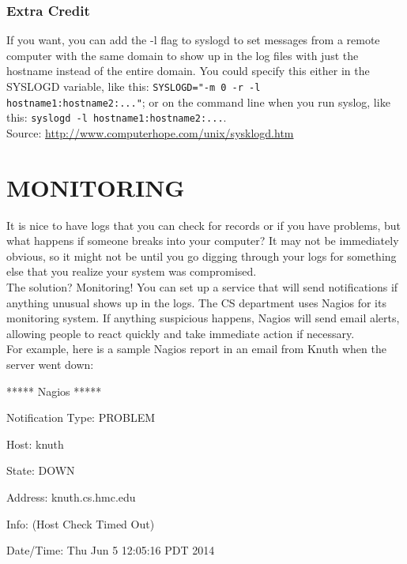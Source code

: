 \documentclass{article}
\begin{document}
\subsubsection*{Extra Credit}

\indent\indent If you want, you can add the -l flag to syslogd to set messages from a remote computer with the same domain to show up in the log files with just the hostname instead of the entire domain. You could specify this either in  the SYSLOGD variable, like this: \verb|SYSLOGD="-m 0 -r -l hostname1:hostname2:..."|; or on the command line when you run syslog, like this: \verb|syslogd -l hostname1:hostname2:...|. \\

Source:  \url{http://www.computerhope.com/unix/sysklogd.htm}

\section*{MONITORING}

\indent\indent It is nice to have logs that you can check for records or if you have problems, but what happens if someone breaks into your computer? It may not be immediately obvious, so it might not be until you go digging through your logs for something else that you realize your system was compromised. \\

The solution? Monitoring! You can set up a service that will send notifications if anything unusual shows up in the logs. The CS department uses Nagios for its monitoring system. If anything suspicious happens, Nagios will send email alerts, allowing people to react quickly and take immediate action if necessary. \\

For example, here is a sample Nagios report in an email from Knuth when the server went down:



\begin{center}
    \parbox{0.5\textwidth}
    {\raggedright
    ***** Nagios *****
    
    Notification Type: PROBLEM
    
    Host: knuth
    
    State: DOWN
    
    Address: knuth.cs.hmc.edu
    
    Info: (Host Check Timed Out)
    
    Date/Time: Thu Jun 5 12:05:16 PDT 2014
    }
\end{center}
\end{document}

